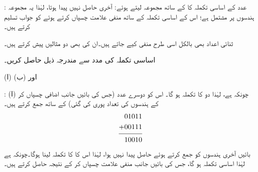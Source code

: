 :\quad 
عدد    کے  اساسی تکملہ      کا     کے ساتھ  مجموعہ     لیتے ہوئے:    آخری حاصل   نہیں    پیدا ہوتا، لہٰذا یہ مجموعہ 
    ہندسوں پر مشتمل ہے؛  اس کے اساسی تکملہ    کے ساتھ منفی  علامت چسپاں کرتے ہوئے  کو جواب تسلیم کرتے ہیں۔
\begin{center}
\begin{otherlanguage}{english}
\quad\quad
{}\quad\quad
{}\quad\quad
{}
\end{otherlanguage}
\end{center}

ثنائی اعداد بھی بالکل اسی طرح منفی کیے جاتے ہیں۔ان کی بھی دو مثالیں پیش کرتے ہیں۔
	

 اساسی تکملہ کی مدد سے مندرجہ ذیل حاصل کریں۔
 
(ا)  اور (ب) 

:\quad
(ا) چونکہ  ہے،   لہٰذا   دو کا تکملہ     ہو گا۔ اس کو  دوسرے عدد   (جس کی بائیں جانب  اضافی  چسپاں کر کے   ہندسوں کی  تعداد  پوری کی گئی) کے ساتھ جمع کرتے ہیں۔
\begin{align*}
\begin{split}
01011&\\
+00111&\\
\noalign{\smallskip}\hline\noalign{\smallskip}
10010&
\end{split}
\end{align*}
بائیں آخری  ہندسوں کو جمع کرتے ہوئے  حاصل    پیدا نہیں ہوا،  لہٰذا اس کا     کا تکملہ  لینا ہوگا۔چونکہ   ہے لہٰذا اساسی تکملہ  ہو گا، جس کی  بائیں جانب منفی  علامت چسپاں کر کے  نتیجہ   حاصل کرتے ہیں۔

